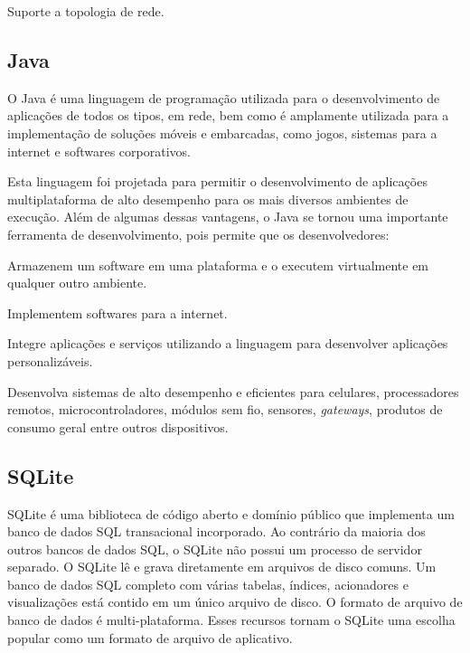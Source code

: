 {{{{{{{\begin{lista}
\item Suporte a topologia de rede.

\end{lista}
\subsection{Java}

O Java é uma linguagem de programação utilizada para o desenvolvimento de aplicações de todos os tipos, em rede, bem como é amplamente utilizada para a implementação de soluções móveis e embarcadas, como jogos, sistemas para a internet e softwares corporativos.

Esta linguagem foi projetada para permitir o desenvolvimento de aplicações multiplataforma de alto desempenho para os mais diversos ambientes de execução. Além de algumas dessas vantagens, o Java se tornou uma importante ferramenta de desenvolvimento, pois permite que os desenvolvedores:

\begin{lista}
\item Armazenem um software em uma plataforma e o executem virtualmente em qualquer outro ambiente.
\item Implementem softwares para a internet.
\item Integre aplicações e serviços utilizando a linguagem para desenvolver aplicações personalizáveis.
\item Desenvolva sistemas de alto desempenho e eficientes para celulares, processadores remotos, microcontroladores, módulos sem fio, sensores, \textit{gateways}, produtos de consumo geral entre outros dispositivos.
\end{lista}

\subsection{SQLite}

SQLite é uma biblioteca de código aberto e domínio público que implementa um banco de dados SQL transacional incorporado. Ao contrário da maioria dos outros bancos de dados SQL, o SQLite não possui um processo de servidor separado. O SQLite lê e grava diretamente em arquivos de disco comuns. Um banco de dados SQL completo com várias tabelas, índices, acionadores e visualizações está contido em um único arquivo de disco. O formato de arquivo de banco de dados é multi-plataforma. Esses recursos tornam o SQLite uma escolha popular como um formato de arquivo de aplicativo.

}}}}}}}
